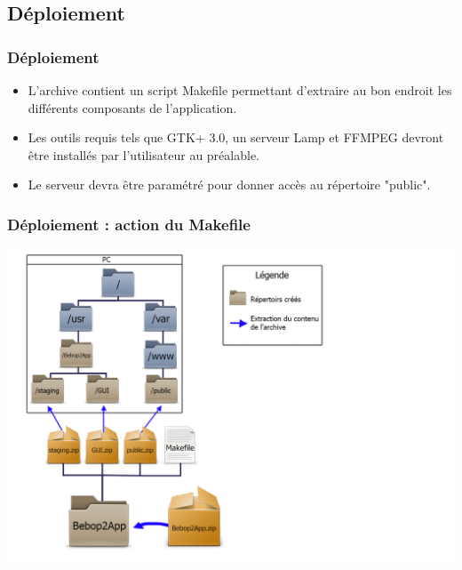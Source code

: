 \documentclass{beamer}
\begin{document}
	
	
	\begin{frame}
	\section{Déploiement}
		\begin{center}
		\frametitle{Déploiement}
		\begin{itemize}
	    \item	L'archive contient un script Makefile permettant d'extraire au bon endroit les différents composants de l'application.\\
	    \item	Les outils requis tels que GTK+ 3.0, un serveur Lamp et FFMPEG devront être installés par l'utilisateur au préalable.\\
	    \item	Le serveur devra être paramétré pour donner accès au répertoire "public".\\
		\end{itemize}
		\end{center}
	\end{frame}
	
	
	\begin{frame}
		\begin{center}
		\frametitle{Déploiement : action du Makefile}
        \includegraphics[scale=0.3]{schéma_déploiement_01.png}
		\end{center}
	\end{frame}
	
\end{document}
